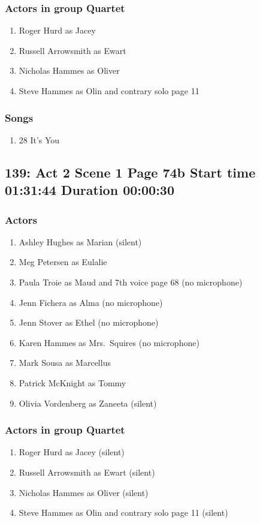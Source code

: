 \subsubsection{Actors in group Quartet}
\begin{enumerate}
\item Roger Hurd as Jacey
\item Russell Arrowsmith as Ewart
\item Nicholas Hammes as Oliver
\item Steve Hammes as Olin and contrary solo page 11
\end{enumerate}

\subsubsection{Songs}
\begin{enumerate}
\item 28 It's You
\end{enumerate}
\subsection{139: Act 2 Scene 1 Page 74b Start time 01:31:44 Duration 00:00:30}

\subsubsection{Actors}
\begin{enumerate}
\item Ashley Hughes as Marian (silent)
\item Meg Petersen as Eulalie
\item Paula Troie as Maud and 7th voice page 68 (no microphone)
\item Jenn Fichera as Alma (no microphone)
\item Jenn Stover as Ethel (no microphone)
\item Karen Hammes as Mrs.~Squires (no microphone)
\item Mark Sousa as Marcellus
\item Patrick McKnight as Tommy
\item Olivia Vordenberg as Zaneeta (silent)
\end{enumerate}
\subsubsection{Actors in group Quartet}
\begin{enumerate}
\item Roger Hurd as Jacey (silent)
\item Russell Arrowsmith as Ewart (silent)
\item Nicholas Hammes as Oliver (silent)
\item Steve Hammes as Olin and contrary solo page 11 (silent)
\end{enumerate}

